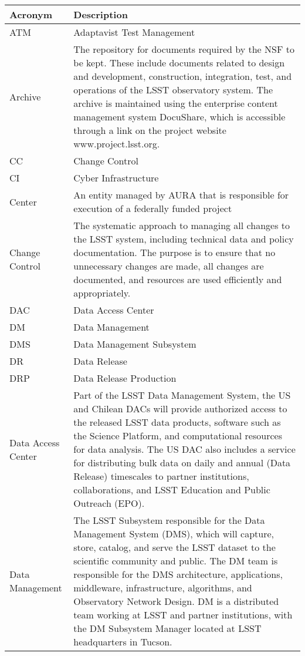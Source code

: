 \addtocounter{table}{-1}
\begin{longtable}{|p{}|p{}|}\hline
\textbf{Acronym} & \textbf{Description}  \\\hline

ATM & Adaptavist Test Management \\\hline
Archive & The repository for documents required by the NSF to be kept. These include documents related to design and development, construction, integration, test, and operations of the LSST observatory system. The archive is maintained using the enterprise content management system DocuShare, which is accessible through a link on the project website www.project.lsst.org. \\\hline
CC & Change Control \\\hline
CI & Cyber Infrastructure \\\hline
Center & An entity managed by AURA that is responsible for execution of a federally funded project \\\hline
Change Control & The systematic approach to managing all changes to the LSST system, including technical data and policy documentation. The purpose is to ensure that no unnecessary changes are made, all changes are documented, and resources are used efficiently and appropriately. \\\hline
DAC & Data Access Center \\\hline
DM & Data Management \\\hline
DMS & Data Management Subsystem \\\hline
DR & Data Release \\\hline
DRP & Data Release Production \\\hline
Data Access Center & Part of the LSST Data Management System, the US and Chilean DACs will provide authorized access to the released LSST data products, software such as the Science Platform, and computational resources for data analysis. The US DAC also includes a service for distributing bulk data on daily and annual (Data Release) timescales to partner institutions, collaborations, and LSST Education and Public Outreach (EPO).  \\\hline
Data Management & The LSST Subsystem responsible for the Data Management System (DMS), which will capture, store, catalog, and serve the LSST dataset to the scientific community and public. The DM team is responsible for the DMS architecture, applications, middleware, infrastructure, algorithms, and Observatory Network Design. DM is a distributed team working at LSST and partner institutions, with the DM Subsystem Manager located at LSST headquarters in Tucson. \\\hline

\end{longtable}
